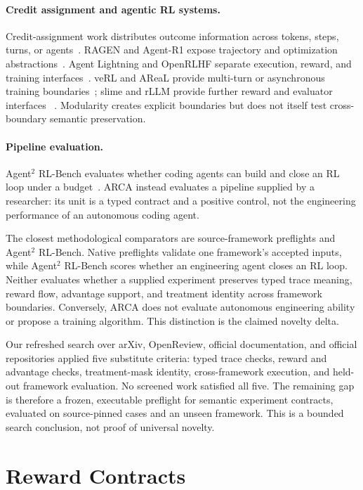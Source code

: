 \documentclass[10pt]{article}
\newcommand{\arca}{\textsc{ARCA}}
\begin{document}
\paragraph{Credit assignment and agentic RL systems.}
Credit-assignment work distributes outcome information across tokens, steps,
turns, or agents~\citep{zhang2026credit}.  RAGEN and Agent-R1 expose
trajectory and optimization abstractions~\citep{wang2025ragen,cheng2025agentr1}.
Agent Lightning and OpenRLHF separate execution, reward, and training
interfaces~\citep{luo2025lightning,openrlhf2026}.  veRL and AReaL provide
multi-turn or asynchronous training boundaries~\citep{verl2026,areal2026};
slime and rLLM provide further reward and evaluator interfaces
~\citep{slime2026,rllm2026}.  Modularity creates explicit boundaries but does
not itself test cross-boundary semantic preservation.

\paragraph{Pipeline evaluation.}
Agent$^2$ RL-Bench evaluates whether coding agents can build and close an RL
loop under a budget~\citep{chen2026agent2}.  \arca{} instead evaluates a
pipeline supplied by a researcher: its unit is a typed contract and a positive
control, not the engineering performance of an autonomous coding agent.

The closest methodological comparators are source-framework preflights and
Agent$^2$ RL-Bench.  Native preflights validate one framework's accepted
inputs, while Agent$^2$ RL-Bench scores whether an engineering agent closes an
RL loop.  Neither evaluates whether a supplied experiment preserves typed
trace meaning, reward flow, advantage support, and treatment identity across
framework boundaries.  Conversely, \arca{} does not evaluate autonomous
engineering ability or propose a training algorithm.  This distinction is the
claimed novelty delta.

Our refreshed search over arXiv, OpenReview, official documentation, and
official repositories applied five substitute criteria: typed trace checks,
reward and advantage checks, treatment-mask identity, cross-framework
execution, and held-out framework evaluation.  No screened work satisfied all
five.  The remaining gap is therefore a frozen, executable preflight for
semantic experiment contracts, evaluated on source-pinned cases and an unseen
framework.  This is a bounded search conclusion, not proof of universal
novelty.

\section{Reward Contracts}
\end{document}
